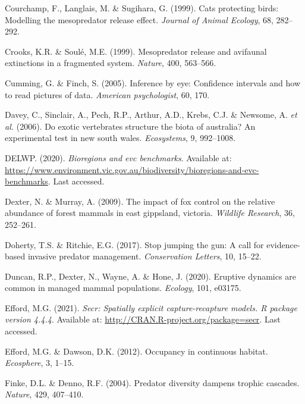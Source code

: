 \documentclass[]{elsarticle} %
\begin{document}
\leavevmode\hypertarget{ref-courchamp1999}{}%
Courchamp, F., Langlais, M. \& Sugihara, G. (1999). Cats protecting birds: Modelling the mesopredator release effect. \emph{Journal of Animal Ecology}, 68, 282--292.

\leavevmode\hypertarget{ref-crooks1999}{}%
Crooks, K.R. \& Soulé, M.E. (1999). Mesopredator release and avifaunal extinctions in a fragmented system. \emph{Nature}, 400, 563--566.

\leavevmode\hypertarget{ref-cumming2005inference}{}%
Cumming, G. \& Finch, S. (2005). Inference by eye: Confidence intervals and how to read pictures of data. \emph{American psychologist}, 60, 170.

\leavevmode\hypertarget{ref-davey2006}{}%
Davey, C., Sinclair, A., Pech, R.P., Arthur, A.D., Krebs, C.J. \& Newsome, A. \emph{et al.} (2006). Do exotic vertebrates structure the biota of australia? An experimental test in new south wales. \emph{Ecosystems}, 9, 992--1008.

\leavevmode\hypertarget{ref-delwp2020}{}%
DELWP. (2020). \emph{Bioregions and evc benchmarks}. Available at: \url{https://www.environment.vic.gov.au/biodiversity/bioregions-and-evc-benchmarks}. Last accessed.

\leavevmode\hypertarget{ref-dexter2009impact}{}%
Dexter, N. \& Murray, A. (2009). The impact of fox control on the relative abundance of forest mammals in east gippsland, victoria. \emph{Wildlife Research}, 36, 252--261.

\leavevmode\hypertarget{ref-doherty2017}{}%
Doherty, T.S. \& Ritchie, E.G. (2017). Stop jumping the gun: A call for evidence-based invasive predator management. \emph{Conservation Letters}, 10, 15--22.

\leavevmode\hypertarget{ref-duncan2020eruptive}{}%
Duncan, R.P., Dexter, N., Wayne, A. \& Hone, J. (2020). Eruptive dynamics are common in managed mammal populations. \emph{Ecology}, 101, e03175.

\leavevmode\hypertarget{ref-efford2021secr}{}%
Efford, M.G. (2021). \emph{Secr: Spatially explicit capture-recapture models. R package version 4.4.4}. Available at: \url{http://CRAN.R-project.org/package=secr}. Last accessed.

\leavevmode\hypertarget{ref-efford2012}{}%
Efford, M.G. \& Dawson, D.K. (2012). Occupancy in continuous habitat. \emph{Ecosphere}, 3, 1--15.

\leavevmode\hypertarget{ref-finke2004}{}%
Finke, D.L. \& Denno, R.F. (2004). Predator diversity dampens trophic cascades. \emph{Nature}, 429, 407--410.
\end{document}
